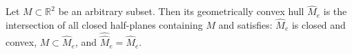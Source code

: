 Let $M \subset \mathbb{R}^2$ be an arbitrary subset. Then its geometrically convex hull $\hat{M}_e$ is the intersection of all closed half-planes containing $M$ and satisfies: $\hat{M}_e$ is closed and convex, $M \subset \hat{M}_e$, and $\hat{\hat{M}}_e = \hat{M}_e$.
